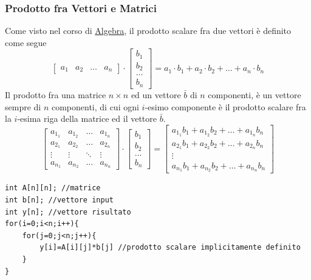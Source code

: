 \documentclass[10pt, letterpaper]{report}
\begin{document}
\subsubsection{Prodotto fra Vettori e Matrici}
Come visto nel corso di 
\color{blue}\href{https://github.com/CasuFrost/University_notes/blob/main/Secondo%20Anno/Primo%20Semestre/Algebra/Latex%20source%20file/Algebra.pdf}{Algebra}\color{black}, 
il prodotto scalare fra due vettori è definito come segue 
$$ \begin{bmatrix}
    a_1&a_2&\dots&a_n
\end{bmatrix}\cdot \begin{bmatrix}
    b_1\\b_2\\\dots\\b_n
\end{bmatrix}=a_1\cdot b_1 + a_2\cdot b_2+\dots + a_n\cdot b_n$$
Il prodotto fra una matrice $n\times n$ ed un vettore $\bar b$ di $n$ componenti, è un vettore sempre di 
$n$ componenti, di cui ogni $i$-esimo componente è il prodotto scalare fra la $i$-esima riga della matrice 
ed il vettore $\bar b$. 
$$ \begin{bmatrix}
    a_{1_1}&a_{1_2}&\dots&a_{1_n}\\ 
    a_{2_1}&a_{2_2}&\dots&a_{2_n}\\ 
    \vdots & \vdots &\ddots & \vdots\\ 
    a_{n_1}&a_{n_2}&\dots&a_{n_n}
\end{bmatrix}\cdot \begin{bmatrix}
    b_1\\b_2\\\dots\\b_n
\end{bmatrix}=\begin{bmatrix}
    a_{1_1}b_1+a_{1_2}b_2+\dots+a_{1_n}b_n\\
    a_{2_1}b_1+a_{2_2}b_2+\dots+a_{2_n}b_n\\
    \vdots\\
    a_{n_1}b_1+a_{n_2}b_2+\dots+a_{n_n}b_n
\end{bmatrix}$$
\begin{lstlisting}[style=CStyle]
int A[n][n]; //matrice 
int b[n]; //vettore input
int y[n]; //vettore risultato
for(i=0;i<n;i++){
    for(j=0;j<n;j++){
        y[i]=A[i][j]*b[j] //prodotto scalare implicitamente definito
    }
}
\end{lstlisting}
\end{document}
